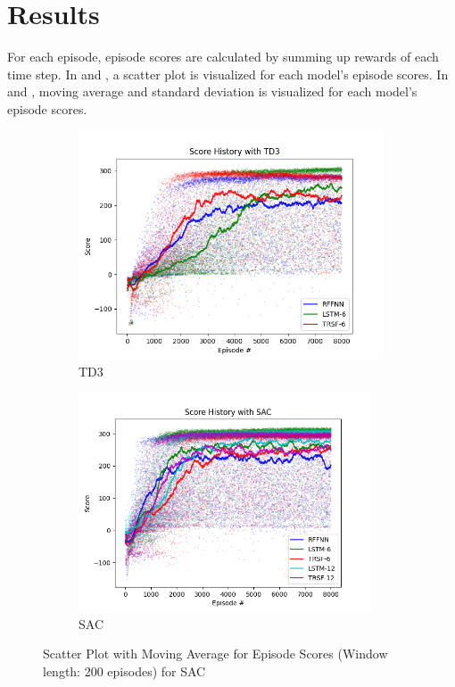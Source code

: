 \section{Results}

For each episode, episode scores are calculated by summing up rewards of each time step. 
In  and , a scatter plot is visualized for each model's episode scores. 
In  and , moving average and standard deviation is visualized for each model's episode scores. 

\begin{figure}[!ht]
	\centering
	\begin{subfigure}{.49\textwidth}
		\centering
		\includegraphics[width=0.99\textwidth]{figures/bipedal/SCT_TD3_RFFNN_LSTM-6_TRSF-6.png}
		\caption{TD3}
		\label{fig:td3_scatter_ep_rewards}
	\end{subfigure}
	\begin{subfigure}{.49\textwidth}
		\centering
		\includegraphics[width=0.95\textwidth]{figures/bipedal/SCT_SAC_RFFNN_LSTM-6_TRSF-6_LSTM-12_TRSF-12.png}
		\caption{SAC}
		\label{fig:sac_scatter_ep_rewards}
	\end{subfigure}
	\caption{Scatter Plot with Moving Average for Episode Scores (Window length: 200 episodes) for SAC}
\end{figure}

